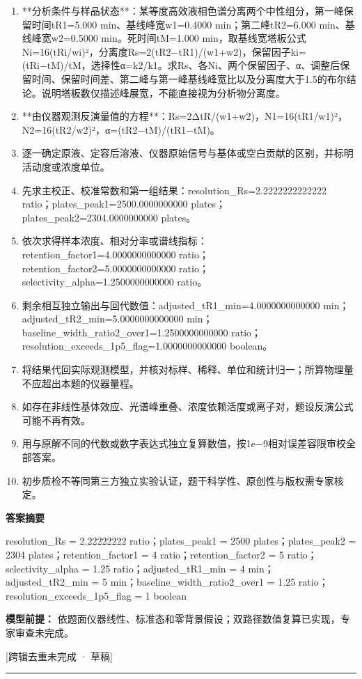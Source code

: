 \documentclass[UTF8,11pt,a4paper]{ctexart}
\begin{document}
\begin{enumerate}
\item **分析条件与样品状态**：某等度高效液相色谱分离两个中性组分，第一峰保留时间tR1=5.000 min、基线峰宽w1=0.4000 min；第二峰tR2=6.000 min、基线峰宽w2=0.5000 min。死时间tM=1.000 min，取基线宽塔板公式Ni=16(tRi/wi)²，分离度Rs=2(tR2−tR1)/(w1+w2)，保留因子ki=(tRi−tM)/tM，选择性α=k2/k1。求Rs、各Ni、两个保留因子、α、调整后保留时间、保留时间差、第二峰与第一峰基线峰宽比以及分离度大于1.5的布尔结论。说明塔板数仅描述峰展宽，不能直接视为分析物分离度。
\item **由仪器观测反演量值的方程**：Rs=2ΔtR/(w1+w2)，N1=16(tR1/w1)²，N2=16(tR2/w2)²，α=(tR2−tM)/(tR1−tM)。
\item 逐一确定原液、定容后溶液、仪器原始信号与基体或空白贡献的区别，并标明活动度或浓度单位。
\item 先求主校正、校准常数和第一组结果：resolution\_Rs=2.2222222222222 ratio；plates\_peak1=2500.0000000000 plates；plates\_peak2=2304.0000000000 plates。
\item 依次求得样本浓度、相对分率或谱线指标：retention\_factor1=4.0000000000000 ratio；retention\_factor2=5.0000000000000 ratio；selectivity\_alpha=1.2500000000000 ratio。
\item 剩余相互独立输出与回代数值：adjusted\_tR1\_min=4.0000000000000 min；adjusted\_tR2\_min=5.0000000000000 min；baseline\_width\_ratio2\_over1=1.2500000000000 ratio；resolution\_exceeds\_1p5\_flag=1.0000000000000 boolean。
\item 将结果代回实际观测模型，并核对标样、稀释、单位和统计归一；所算物理量不应超出本题的仪器量程。
\item 如存在非线性基体效应、光谱峰重叠、浓度依赖活度或离子对，题设反演公式可能不再有效。
\item 用与原解不同的代数或数字表达式独立复算数值，按1e−9相对误差容限审校全部答案。
\item 初步质检不等同第三方独立实验认证，题干科学性、原创性与版权需专家核定。
\end{enumerate}
\noindent\textbf{答案摘要}\par
resolution\_Rs = 2.22222222 ratio；plates\_peak1 = 2500 plates；plates\_peak2 = 2304 plates；retention\_factor1 = 4 ratio；retention\_factor2 = 5 ratio；selectivity\_alpha = 1.25 ratio；adjusted\_tR1\_min = 4 min；adjusted\_tR2\_min = 5 min；baseline\_width\_ratio2\_over1 = 1.25 ratio；resolution\_exceeds\_1p5\_flag = 1 boolean\par
\noindent\textbf{模型前提：}
依题面仪器线性、标准态和零背景假设；双路径数值复算已实现，专家审查未完成。\par
\noindent\textcolor{red!65!black}{[跨辑去重未完成 · 草稿]} \par
\medskip\hrule\medskip
{}
\end{document}

